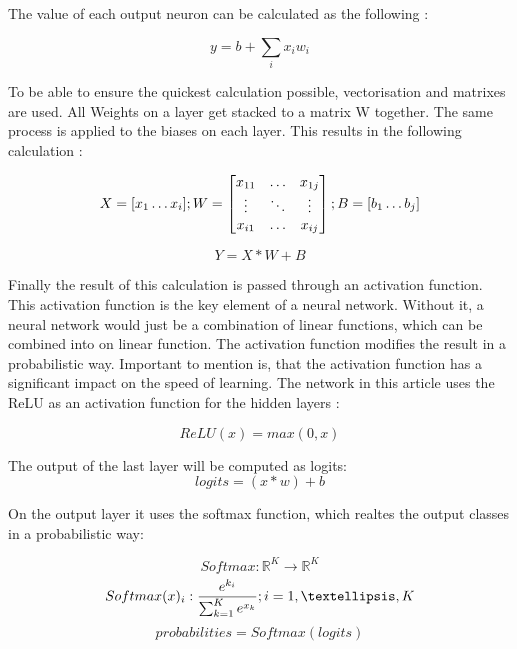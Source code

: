 The value of each output neuron can be calculated as the following \cite{medium_nn_from_scratch}:

\begin{equation}
y = b + \sum_{i} x_i w_i
\end{equation}

To be able to ensure the quickest calculation possible, vectorisation and matrixes are used.
All Weights on a layer get stacked to a matrix W together.
The same process is applied to the biases on each layer.
This results in the following calculation
\cite{medium_nn_from_scratch}:

\begin{equation}
X = [ x_1 \dots x_i ]; \space W = 
\begin{bmatrix}
    x_{11} & \dots  & x_{1j} \\
    \vdots & \ddots & \vdots \\
    x_{i1} & \dots  & x_{ij}
\end{bmatrix}; \space
B = [ b_1 \dots b_j ]
\end{equation}

\begin{equation}
    Y = X * W + B
\end{equation}

Finally the result of this calculation is passed through an activation function.
This activation function is the key element of a neural network.
Without it, a neural network would just be a combination of linear functions, which can be combined into on linear function.
The activation function modifies the result in a probabilistic way.
Important to mention is, that the activation function has a significant impact on the speed of learning.
The network in this article uses the ReLU as an activation function for the hidden layers \cite{math_nn_skalski,relu}:

\begin{equation}
    ReLU(x) = max(0,x)
\end{equation}

The output of the last layer will be computed as logits:
$$logits = (x*w)+b$$

On the output layer it uses the softmax function, which realtes the output classes in a probabilistic way:

\begin{equation}
    Softmax : \mathbb{R}^K \to \mathbb{R}^K
\end{equation}
\begin{equation}
    Softmax(x)_i : \frac{e^{k_i}}{\sum_{k=1}^K e^{x_k}}
\space ; i = 1, …, K
\end{equation}
\begin{equation}
    probabilities = Softmax(logits)
\end{equation}

